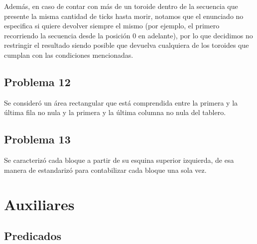 \documentclass[a4paper]{article}
\begin{document}
	        Además, en caso de contar con más de un toroide dentro de la secuencia que presente la misma cantidad de ticks hasta morir, notamos que el enunciado no especifica si quiere devolver siempre el mismo (por ejemplo, el primero recorriendo la secuencia desde la posición 0 en adelante), por lo que decidimos no restringir el resultado siendo posible que devuelva cualquiera de los toroides que cumplan con las condiciones mencionadas.
	    
	    \subsection{Problema 12}
	    
	        Se consideró un área rectangular que está comprendida entre la primera y la última fila no nula y la primera y la última columna no nula del tablero. 
	        
	    \subsection{Problema 13}
	        
	        Se caracterizó cada bloque a partir de su esquina superior izquierda, de esa manera de estandarizó para contabilizar cada bloque una sola vez. 
	    
    	    \newpage
	
	\section{Auxiliares}
	
    	\subsection{Predicados} \vspace{1em}
	
        	 \\
        	
        	 \\
        	
        	 \\
        	
\end{document}
